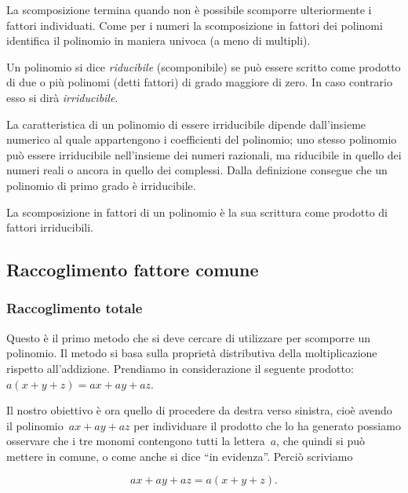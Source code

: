 La scomposizione termina quando non è possibile scomporre ulteriormente i 
fattori individuati.
Come per i numeri la scomposizione in fattori dei polinomi identifica il 
polinomio in maniera univoca (a meno di multipli).

\begin{definizione}
Un polinomio si dice \emph{riducibile} (scomponibile) se può essere scritto 
come prodotto di due o più polinomi (detti fattori) di grado maggiore di zero.
In caso contrario esso si dirà \emph{irriducibile}.
\end{definizione}

La caratteristica di un polinomio di essere irriducibile dipende dall'insieme 
numerico al quale appartengono i coefficienti del polinomio;
uno stesso polinomio può essere irriducibile nell'insieme dei numeri 
razionali, ma riducibile in quello dei numeri reali o ancora in quello dei 
complessi.
Dalla definizione consegue che un polinomio di primo grado è irriducibile.

\begin{definizione}
La scomposizione in fattori di un polinomio è la sua scrittura come prodotto 
di fattori irriducibili.
\end{definizione}

\subsection{Raccoglimento fattore comune}
\label{subsec:divpol_fattorecomune}

\subsubsection{Raccoglimento totale}

Questo è il primo metodo che si deve cercare di utilizzare per scomporre un 
polinomio.
Il metodo si basa sulla proprietà distributiva della moltiplicazione rispetto 
all'addizione.
Prendiamo in considerazione il seguente prodotto:~\(a(x+y+z)=ax+ay+az\).

Il nostro obiettivo è ora quello di procedere da destra verso sinistra, 
cioè avendo il polinomio~\(ax+ay+az\) per individuare il 
prodotto che lo ha generato possiamo osservare che i tre monomi contengono 
tutti la lettera~\(a\), che quindi si può mettere in comune,
o come anche si dice ``in evidenza''. Perciò scriviamo 

\[ax+ay+az=a(x+y+z).\]

